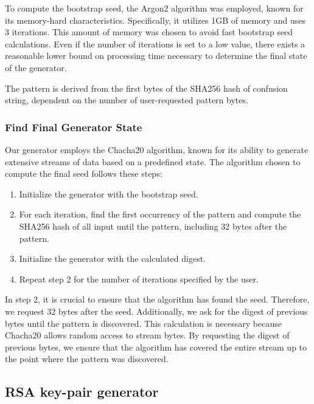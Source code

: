 \documentclass{article} %
\begin{document}
To compute the bootstrap seed, the Argon2 algorithm was employed, known for its memory-hard characteristics. Specifically, it utilizes 1GB of memory and uses 3 iterations. This amount of memory was chosen to avoid fast bootstrap seed calculations. Even if the number of iterations is set to a low value, there exists a reasonable lower bound on processing time necessary to determine the final state of the generator.

The pattern is derived from the first bytes of the SHA256 hash of confusion string, dependent on the number of user-requested pattern bytes.

\subsubsection{Find Final Generator State}

Our generator employs the Chacha20 algorithm, known for its ability to generate extensive streams of data based on a predefined state. The algorithm chosen to compute the final seed follows these steps:

\begin{enumerate}
    \item Initialize the generator with the bootstrap seed.
    \item For each iteration, find the first occurrency of the pattern and compute the SHA256 hash of all input until the pattern, including 32 bytes after the pattern.
    \item Initialize the generator with the calculated digest.
    \item Repeat step 2 for the number of iterations specified by the user.
\end{enumerate}

In step 2, it is crucial to ensure that the algorithm has found the seed. Therefore, we request 32 bytes after the seed. Additionally, we ask for the digest of previous bytes until the pattern is discovered. This calculation is necessary because Chacha20 allows random access to stream bytes. By requesting the digest of previous bytes, we ensure that the algorithm has covered the entire stream up to the point where the pattern was discovered.
\subsection{RSA key-pair generator}
\end{document}
